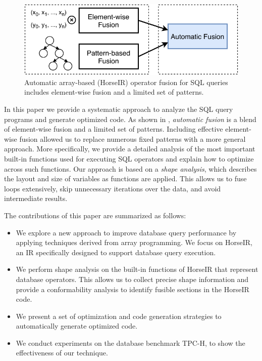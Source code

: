 
\begin{figure}[htbp]
\centering
\includegraphics[width=.95\columnwidth]{./src/figure/basic-idea.pdf}
\caption{Automatic array-based (HorseIR) operator fusion for SQL queries includes element-wise fusion and a limited set of patterns.}
\label{fig:fusion_idea}
\end{figure}

In this paper we provide a systematic approach to analyze the SQL query programs
and generate optimized code. As shown in ,
\textit{automatic fusion} is a blend of element-wise fusion and a limited set of
patterns. Including effective element-wise fusion allowed us to replace numerous fixed
patterns with a more general approach. More specifically, we provide a detailed
analysis of the most important built-in functions used for executing SQL operators
and explain how to optimize across such functions. Our approach is based on a
\textit{shape analysis}, which describes the layout and size of variables as
functions are applied. This allows us to fuse loops extensively, skip unnecessary
iterations over the data, and avoid intermediate results.  

The contributions of this paper are summarized as follows:

\begin{itemize}
\item We explore a new approach to improve database query performance by
      applying techniques derived from array programming. We focus on HorseIR, an IR specifically designed to support database query execution.
\item We perform shape analysis on the built-in functions of HorseIR that represent database operators. This allows us to collect precise shape information and provide a conformability analysis to identify fusible sections in the HorseIR code. 
\item We present a set of optimization and code generation strategies to automatically
      generate optimized code.
\item We conduct experiments on the database benchmark TPC-H, to show the effectiveness of our technique.
\end{itemize}

